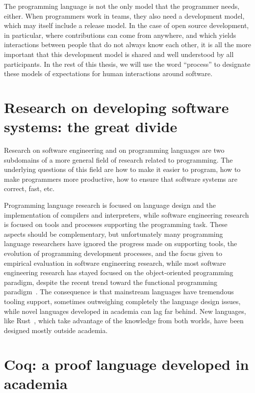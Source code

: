The programming language is not the only model that the programmer needs, either.
When programmers work in teams, they also need a development model, which may itself include a release model.
In the case of open source development, in particular, where contributions can come from anywhere, and which yields interactions between people that do not always know each other, it is all the more important that this
development model is shared and well understood by all participants.
In the rest of this thesis, we will use the word ``process'' to designate these models of expectations for human interactions around software.

\section{Research on developing software systems: the great divide}

Research on software engineering and on programming languages are two subdomains of a more general field of research related to programming.
The underlying questions of this field are how to make it easier to program, how to make programmers more productive, how to ensure that software systems are correct, fast, etc.

Programming language research is focused on language design and the implementation of compilers and interpreters, while software engineering research is focused on tools and processes supporting the programming task.
These aspects should be complementary, but unfortunately many programming language researchers have ignored the progress made on supporting tools, the evolution of programming development processes, and the focus given to empirical evaluation in software engineering research, while most software engineering research has stayed focused on the object-oriented programming paradigm, despite the recent trend toward the functional programming paradigm~\cite{murphy2014programming}.
The consequence is that mainstream languages have tremendous tooling support, sometimes outweighing completely the language design issues, while novel languages developed in academia can lag far behind.
New languages, like Rust~\cite{matsakis2014rust}, which take advantage of the knowledge from both worlds, have been designed mostly outside academia.

\section{Coq: a proof language developed in academia}

